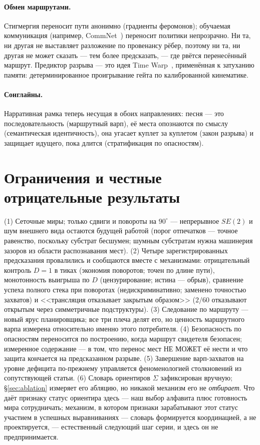 \documentclass{article}
\begin{document}
\paragraph{Обмен маршрутами.} Стигмергия переносит пути анонимно
(градиенты феромонов); обучаемая коммуникация (например,
CommNet~\cite{sukhbaatar2016commnet}) переносит политики непрозрачно.
Ни та, ни другая не выставляет разложение по провенансу рёбер, поэтому
ни та, ни другая не может сказать --- тем более предсказать, --- где
рвётся перенесённый маршрут. Предиктор разрыва --- это идея Time
Warp~\cite{jefferson1985}, применённая к затуханию памяти:
детерминированное проигрывание гейта по калиброванной кинематике.
\paragraph{Сонглайны.} Нарративная рамка теперь несущая в обоих
направлениях: песня --- это последовательность (маршрутный варп), её
места опознаются по смыслу (семантическая идентичность), она угасает
куплет за куплетом (закон разрыва) и защищает идущего, пока длится
(стратификация по опасностям).

\section{Ограничения и честные отрицательные результаты}
\label{sec:limits}

(1) Сеточные миры; только сдвиги и повороты на $90^\circ$ ---
непрерывное $SE(2)$ и шум внешнего вида остаются будущей работой
(порог отпечатков --- точное равенство, поскольку субстрат бесшумен;
шумным субстратам нужна машинерия зазоров из области распознавания
мест). (2) Четыре зарегистрированных предсказания провалились и
сообщаются вместе с механизмами: отрицательный контроль $D{=}1$ в
тиках (экономия поворотов; точен по длине пути), монотонность выигрыша
по $D$ (цензурирование; истина --- обрыв), сравнение успеха полного
стека при поворотах (недискриминативно; заменено точностью захватов) и
<<трансляция отказывает закрытым образом>> ($2/60$ отказывают открытым
через симметричные подструктуры). (3) Следование по маршруту --- новый
ярус планировщика; все три плеча делят его, но ценность маршрутного
варпа измерена относительно именно этого потребителя. (4) Безопасность
по опасностям переносится по построению, когда маршрут свидетеля
безопасен; измеренное содержание --- в том, что перенос мест НЕ МОЖЕТ
её нести и что защита кончается на предсказанном разрыве. (5)
Завершение варп-захватов на уровне дефицита по-прежнему управляется
феноменологией столкновений из сопутствующей статьи. (6) Словарь
ориентиров $\Sigma$ зафиксирован вручную; \S\ref{sec:ablation}
измеряет его абляцию, но никакой механизм его не \emph{отбирает}. Что
даёт признаку статус ориентира здесь --- наш выбор алфавита плюс
готовность мира сотрудничать; механизм, в котором признаки
зарабатывают этот статус участием в успешных выравниваниях --- словарь
формируется координацией, а не проектируется, --- естественный
следующий шаг серии, и здесь он не предпринимается.
\end{document}
